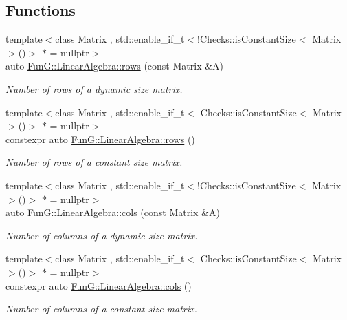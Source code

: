 \subsection*{Functions}
\begin{DoxyCompactItemize}
\item 
{\footnotesize template$<$class Matrix , std\+::enable\+\_\+if\+\_\+t$<$!\+Checks\+::is\+Constant\+Size$<$ Matrix $>$()$>$ $\ast$  = nullptr$>$ }\\auto \hyperlink{namespaceFunG_1_1LinearAlgebra_abd3afa2fcd2194787342b2662cfa9f5a}{Fun\+G\+::\+Linear\+Algebra\+::rows} (const Matrix \&A)
\begin{DoxyCompactList}\small\item\em Number of rows of a dynamic size matrix. \end{DoxyCompactList}\item 
{\footnotesize template$<$class Matrix , std\+::enable\+\_\+if\+\_\+t$<$ Checks\+::is\+Constant\+Size$<$ Matrix $>$()$>$ $\ast$  = nullptr$>$ }\\constexpr auto \hyperlink{namespaceFunG_1_1LinearAlgebra_ab401cccb1259e724bf37d2e198e2ca3d}{Fun\+G\+::\+Linear\+Algebra\+::rows} ()
\begin{DoxyCompactList}\small\item\em Number of rows of a constant size matrix. \end{DoxyCompactList}\item 
{\footnotesize template$<$class Matrix , std\+::enable\+\_\+if\+\_\+t$<$!\+Checks\+::is\+Constant\+Size$<$ Matrix $>$()$>$ $\ast$  = nullptr$>$ }\\auto \hyperlink{namespaceFunG_1_1LinearAlgebra_ae981b8bee32eea3ce87f41874835c9c1}{Fun\+G\+::\+Linear\+Algebra\+::cols} (const Matrix \&A)
\begin{DoxyCompactList}\small\item\em Number of columns of a dynamic size matrix. \end{DoxyCompactList}\item 
{\footnotesize template$<$class Matrix , std\+::enable\+\_\+if\+\_\+t$<$ Checks\+::is\+Constant\+Size$<$ Matrix $>$()$>$ $\ast$  = nullptr$>$ }\\constexpr auto \hyperlink{namespaceFunG_1_1LinearAlgebra_a9eb685419fe4c5f91619d5aa0f973320}{Fun\+G\+::\+Linear\+Algebra\+::cols} ()
\begin{DoxyCompactList}\small\item\em Number of columns of a constant size matrix. \end{DoxyCompactList}\end{DoxyCompactItemize}
